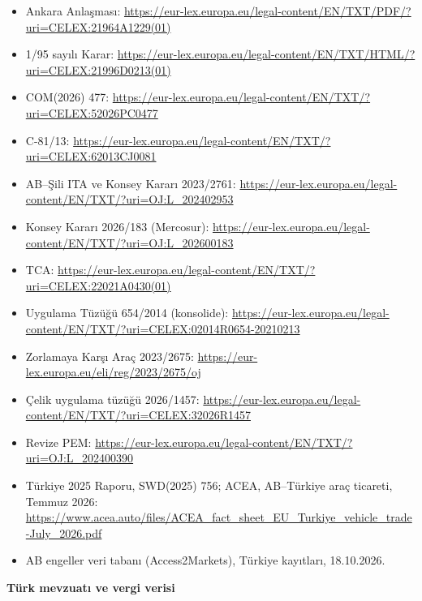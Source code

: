 \begin{itemize}
\tightlist
\item
  Ankara Anlaşması: \url{https://eur-lex.europa.eu/legal-content/EN/TXT/PDF/?uri=CELEX:21964A1229(01)}
\item
  1/95 sayılı Karar: \url{https://eur-lex.europa.eu/legal-content/EN/TXT/HTML/?uri=CELEX:21996D0213(01)}
\item
  COM(2026) 477: \url{https://eur-lex.europa.eu/legal-content/EN/TXT/?uri=CELEX:52026PC0477}
\item
  C-81/13: \url{https://eur-lex.europa.eu/legal-content/EN/TXT/?uri=CELEX:62013CJ0081}
\item
  AB--Şili ITA ve Konsey Kararı 2023/2761: \url{https://eur-lex.europa.eu/legal-content/EN/TXT/?uri=OJ:L_202402953}
\item
  Konsey Kararı 2026/183 (Mercosur): \url{https://eur-lex.europa.eu/legal-content/EN/TXT/?uri=OJ:L_202600183}
\item
  TCA: \url{https://eur-lex.europa.eu/legal-content/EN/TXT/?uri=CELEX:22021A0430(01)}
\item
  Uygulama Tüzüğü 654/2014 (konsolide): \url{https://eur-lex.europa.eu/legal-content/EN/TXT/?uri=CELEX:02014R0654-20210213}
\item
  Zorlamaya Karşı Araç 2023/2675: \url{https://eur-lex.europa.eu/eli/reg/2023/2675/oj}
\item
  Çelik uygulama tüzüğü 2026/1457: \url{https://eur-lex.europa.eu/legal-content/EN/TXT/?uri=CELEX:32026R1457}
\item
  Revize PEM: \url{https://eur-lex.europa.eu/legal-content/EN/TXT/?uri=OJ:L_202400390}
\item
  Türkiye 2025 Raporu, SWD(2025) 756; ACEA, AB--Türkiye araç ticareti, Temmuz 2026: \url{https://www.acea.auto/files/ACEA_fact_sheet_EU_Turkiye_vehicle_trade-July_2026.pdf}
\item
  AB engeller veri tabanı (Access2Markets), Türkiye kayıtları, 18.10.2026.
\end{itemize}

\textbf{Türk mevzuatı ve vergi verisi}

